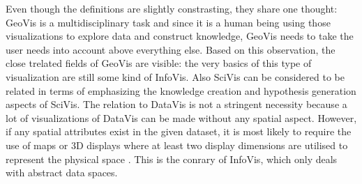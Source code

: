\begin{enumerate}
Even though the definitions are slightly constrasting, they share one thought: \ac{GeoVis} is a multidisciplinary task and since it is a human being using those visualizations to explore data and construct knowledge, \ac{GeoVis} needs to take the user needs into account above everything else.
Based on this observation, the close trelated fields of \ac{GeoVis} are visible: the very basics of this type of visualization are still some kind of \ac{InfoVis}. Also \ac{SciVis} can be considered to be related in terms of emphasizing the knowledge creation and hypothesis generation aspects of \ac{SciVis}. The relation to \ac{DataVis} is not a stringent necessity because a lot of visualizations of \ac{DataVis} can be made without any spatial aspect. However, if any spatial attributes exist in the given dataset, it is most likely to require the use of maps or 3D displays where at least two display dimensions are utilised to represent the physical space .
This is the conrary of \ac{InfoVis}, which only deals with abstract data spaces.
\end{enumerate}